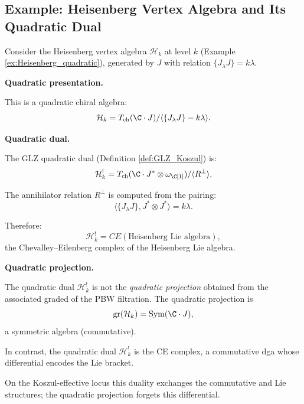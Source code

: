 \subsection{Example: Heisenberg Vertex Algebra and Its Quadratic Dual}
\begin{example}
\label{ex:Heisenberg_Koszul}
Consider the Heisenberg vertex algebra $\mathcal{H}_k$ at level $k$ (Example \ref{ex:Heisenberg_quadratic}), generated by $J$ with relation $\{J_\lambda J\} = k\lambda$.

\textbf{Quadratic presentation.}

This is a quadratic chiral algebra:
\begin{equation}
\mathcal{H}_k = T_{\text{ch}}(\C \cdot J) / \langle \{J_\lambda J\} - k\lambda \rangle.
\end{equation}

\textbf{Quadratic dual.}

The GLZ quadratic dual (Definition \ref{def:GLZ_Koszul}) is:
\begin{equation}
\mathcal{H}_k^! = T_{\text{ch}}(\C \cdot J^* \otimes \omega_\C[1]) / \langle R^\perp \rangle.
\end{equation}

The annihilator relation $R^\perp$ is computed from the pairing:
\begin{equation}
\langle \{J_\lambda J\}, J^* \otimes J^* \rangle = k\lambda.
\end{equation}

Therefore:
\begin{equation}
\mathcal{H}_k^! = CE(\text{Heisenberg Lie algebra}),
\end{equation}
the Chevalley--Eilenberg complex of the Heisenberg Lie algebra.

\textbf{Quadratic projection.}

The quadratic dual $\mathcal{H}_k^!$ is not the \emph{quadratic
projection} obtained from the associated graded of the PBW filtration.
The quadratic projection is
\begin{equation}
\text{gr}(\mathcal{H}_k) = \text{Sym}(\C \cdot J),
\end{equation}
a symmetric algebra (commutative).

In contrast, the quadratic dual $\mathcal{H}_k^!$ is the CE complex,
a commutative dga whose differential encodes the Lie bracket.

On the Koszul-effective locus this duality exchanges the commutative
and Lie structures; the quadratic projection forgets this differential.
\end{example}

